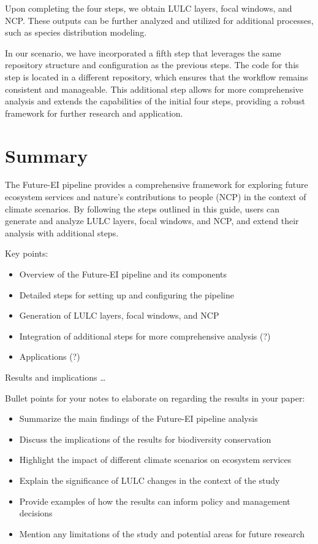 \documentclass[
  letterpaper,
  DIV=11,
  numbers=noendperiod]{scrreprt}
\providecommand{\tightlist}{%
  \setlength{\itemsep}{0pt}\setlength{\parskip}{0pt}}\usepackage{longtable,booktabs,array}
\begin{document}
Upon completing the four steps, we obtain LULC layers, focal windows,
and NCP. These outputs can be further analyzed and utilized for
additional processes, such as species distribution modeling.

In our scenario, we have incorporated a fifth step that leverages the
same repository structure and configuration as the previous steps. The
code for this step is located in a different repository, which ensures
that the workflow remains consistent and manageable. This additional
step allows for more comprehensive analysis and extends the capabilities
of the initial four steps, providing a robust framework for further
research and application.


\chapter{Summary}\label{summary}

The Future-EI pipeline provides a comprehensive framework for exploring
future ecosystem services and nature's contributions to people (NCP) in
the context of climate scenarios. By following the steps outlined in
this guide, users can generate and analyze LULC layers, focal windows,
and NCP, and extend their analysis with additional steps.

Key points:

\begin{itemize}
\tightlist
\item
  Overview of the Future-EI pipeline and its components
\item
  Detailed steps for setting up and configuring the pipeline
\item
  Generation of LULC layers, focal windows, and NCP
\item
  Integration of additional steps for more comprehensive analysis (?)
\item
  Applications (?)
\end{itemize}

Results and implications \ldots{}

Bullet points for your notes to elaborate on regarding the results in
your paper:

\begin{itemize}
\tightlist
\item
  Summarize the main findings of the Future-EI pipeline analysis
\item
  Discuss the implications of the results for biodiversity conservation
\item
  Highlight the impact of different climate scenarios on ecosystem
  services
\item
  Explain the significance of LULC changes in the context of the study
\item
  Provide examples of how the results can inform policy and management
  decisions
\item
  Mention any limitations of the study and potential areas for future
  research
\end{itemize}
\end{document}
